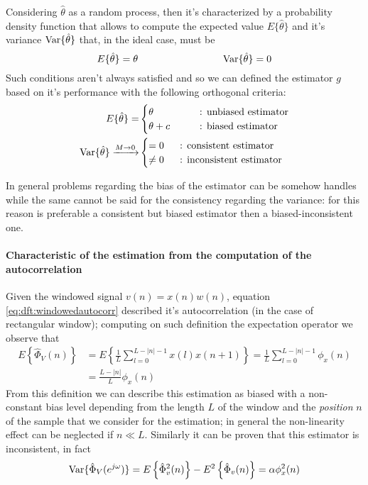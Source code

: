 		Considering $\hat \theta$ as a random process, then it's characterized by a probability density function that allows to compute the expected value $E\{\hat \theta\}$ and it's variance $\textrm{Var}\{\hat \theta\}$ that, in the ideal case, must be
		\[ E\{\hat \theta\} = \theta \hspace{3cm} \var{\hat \theta} = 0 \]
		Such conditions aren't always satisfied and so we can defined the estimator $g$ based on it's performance with the following orthogonal criteria:
		\begin{equation}
		\begin{aligned}
			E \{\hat \theta\} = & \begin{cases}
				\theta \qquad & \text{: unbiased estimator} \\
				\theta + c \qquad & \text{: biased estimator} 
			\end{cases}\\
			\textrm{Var}\{\hat \theta\} \xrightarrow{M\rightarrow 0} & \begin{cases}
				= 0  & \hspace{6pt} \text{: consistent estimator} \\
				\neq 0  &\hspace{6pt} \text{: inconsistent estimator} 
			\end{cases}
		\end{aligned}
		\end{equation}
		
		In general problems regarding the bias of the estimator can be somehow handles while the same cannot be said for the consistency regarding the variance: for this reason is preferable a consistent but biased estimator then a biased-inconsistent one.
		
		\paragraph{Characteristic of the estimation from the computation of the autocorrelation} Given the windowed signal $v(n) = x(n)w(n)$, equation \ref{eq:dft:windowedautocorr} described it's autocorrelation (in the case of rectangular window); computing on such definition the expectation operator we observe that
		\begin{equation}
		\begin{aligned}
			E\left\{ \hat \Phi_V(n) \right\} & = E \left\{ \frac 1 L \sum_{l=0}^{L-|n|-1} x(l) x(n+1) \right\} = \frac 1 L \sum_{l=0}^{L-|n|-1} \phi_x(n) \\ 
			& = \frac{L-|n|}{L} \phi_x(n)
		\end{aligned}
		\end{equation}
		From this definition we can describe this estimation as biased with a non-constant bias level depending from the length $L$ of the window and the \textit{position} $n$ of the sample that we consider for the estimation; in general the non-linearity effect can be neglected if $n \ll L$. Similarly it can be proven that this estimator is inconsistent, in fact
		\begin{equation}
			\textrm{Var}\{\hat \Phi_V(e^{j\omega})\} = E \left\{ \hat \Phi_v^2(n) \right\} - E^2 \left\{ \hat \Phi_v (n) \right\} = \alpha \phi_x^2 (n)
		\end{equation}
		
